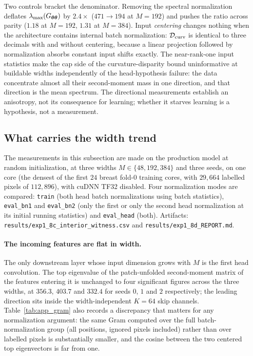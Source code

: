 Two controls bracket the denominator. Removing the spectral normalization
deflates $\lambda_{\max}(G_{{\boldsymbol{\theta}}{\boldsymbol{\theta}}})$ by $2.4\times$ ($471 \to 194$ at
$M = 192$) and pushes the ratio across parity ($1.18$ at $M = 192$, $1.31$ at
$M = 384$). Input \emph{centering} changes nothing when the architecture
contains internal batch normalization: $\mathcal{D}_{\mathrm{curv}}$ is identical to three decimals
with and without centering, because a linear projection followed by
normalization absorbs constant input shifts exactly. The near-rank-one input
statistics make the cap side of the curvature-disparity bound uninformative at
buildable widths independently of the head-hypothesis failure: the data
concentrate almost all their second-moment mass in one direction, and that
direction is the mean spectrum. The directional measurements establish an
anisotropy, not its consequence for learning; whether it starves learning is a
hypothesis, not a measurement.

\subsection{What carries the width trend}
\label{app:prod_width}

The measurements in this subsection are made on the production model at random
initialization, at three widths $M \in \{48, 192, 384\}$ and three seeds, on
one core (the densest of the first $24$ breast fold-0 training cores, with
$29{,}664$ labelled pixels of $112{,}896$), with cuDNN TF32 disabled. Four
normalization modes are compared: \texttt{train} (both head batch
normalizations using batch statistics), \texttt{eval\_bn1} and
\texttt{eval\_bn2} (only the first or only the second head normalization at its
initial running statistics) and \texttt{eval\_head} (both). Artifacts:
\texttt{results/exp1\_8c\_interior\_witness.csv} and
\texttt{results/exp1\_8d\_REPORT.md}.

\paragraph{The incoming features are flat in width.} The only downstream layer
whose input dimension grows with $M$ is the first head convolution. The top
eigenvalue of the patch-unfolded second-moment matrix of the features entering
it is unchanged to four significant figures across the three widths, at
$356.3$, $403.7$ and $332.4$ for seeds $0$, $1$ and $2$ respectively; the
leading direction sits inside the width-independent $K = 64$ skip channels.
Table~\ref{tab:app_gram} also records a discrepancy that matters for any
normalization argument: the same Gram computed over the full batch-normalization
group (all positions, ignored pixels included) rather than over labelled pixels
is substantially smaller, and the cosine between the two centered top
eigenvectors is far from one.

